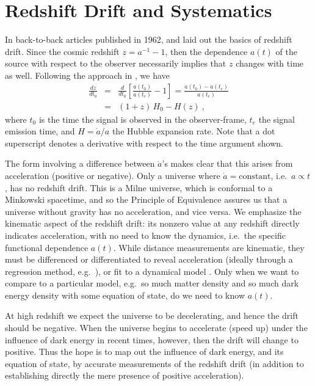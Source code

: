 \documentclass[preprint2, 10pt]{aastex}
\newcommand{\bea}{\begin{eqnarray}}
\newcommand{\eea}{\end{eqnarray}}
\begin{document}
\section{Redshift Drift and Systematics} \label{sec:basic} 

In back-to-back articles published in 1962, \citet{mcvittie} and 
\citet{sandage} laid out the basics of redshift drift.  Since the 
cosmic redshift $z=a^{-1}-1$, then the dependence $a(t)$ of the source with 
respect to the observer necessarily implies that $z$ changes with time as 
well. Following the approach in \citet{fpoc}, we have 
\bea 
\frac{dz}{dt_0}&=&\frac{d}{dt_0}\left[\frac{a(t_0)}{a(t_e)}-1\right] 
=\frac{\dot a(t_0)-\dot a (t_e)}{a(t_e)}\\ 
&=&(1+z)\,H_0-H(z)\ , 
\eea 
where $t_0$ is the time the signal is observed in the observer-frame, 
$t_e$ the signal emission time, and $H=\dot a/a$ the Hubble expansion rate. 
Note that a dot superscript denotes a derivative with respect to the 
time argument shown. 

The form involving a difference 
between $\dot a$'s makes clear that this arises from acceleration (positive 
or negative).
Only a universe where $\dot a=\mbox{constant}$, i.e.\ $a\propto t$, 
has no redshift drift.  This is a Milne universe, which is conformal to a 
Minkowski spacetime, and so the Principle of Equivalence assures us that 
a universe without gravity has no acceleration, and vice versa. 
We emphasize the kinematic aspect of the redshift drift: its nonzero 
value at any redshift directly indicates acceleration, with no need to 
know the dynamics, i.e.\ the specific functional dependence $a(t)$. 
While distance measurements are kinematic, they must be differenced or 
differentiated to reveal acceleration (ideally through a regression 
method, e.g.\ \citet{2012PhRvD..85l3530S,2012JCAP...06..036S}), or fit to 
a dynamical model \citep{1998AJ....116.1009R,1999ApJ...517..565P}. 
Only when we want to compare 
to a particular model, e.g.\ so much matter density and so much dark energy 
density with some equation of state, do we need to know $a(t)$.


At high redshift we expect the universe to be decelerating, and hence 
the drift should be negative.  When the universe begins to accelerate 
(speed up) under the influence of dark energy in recent times, however, 
then the drift will change to positive.  Thus the hope is to map out the 
influence of dark energy, and its equation of state, by accurate 
measurements of the redshift drift (in addition to establishing directly 
the mere presence of positive acceleration). 
\end{document}
